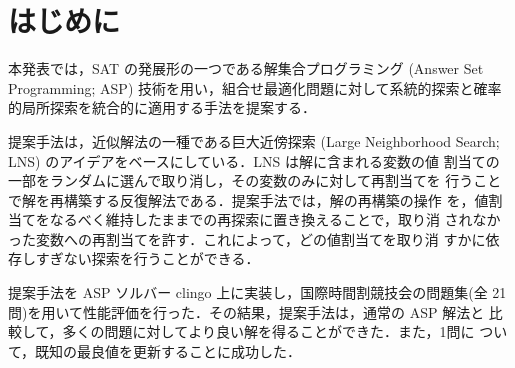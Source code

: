 \section{はじめに}
本発表では，SAT の発展形の一つである解集合プログラミング (Answer Set
Programming; ASP) 技術を用い，組合せ最適化問題に対して系統的探索と確率
的局所探索を統合的に適用する手法を提案する．

提案手法は，近似解法の一種である巨大近傍探索 (Large Neighborhood
Search; LNS) のアイデアをベースにしている．LNS は解に含まれる変数の値
割当ての一部をランダムに選んで取り消し，その変数のみに対して再割当てを
行うことで解を再構築する反復解法である．提案手法では，解の再構築の操作
を，値割当てをなるべく維持したままでの再探索に置き換えることで，取り消
されなかった変数への再割当てを許す．これによって，どの値割当てを取り消
すかに依存しすぎない探索を行うことができる．

提案手法を ASP ソルバー clingo 上に実装し，国際時間割競技会の問題集(全
21問)を用いて性能評価を行った．その結果，提案手法は，通常の ASP 解法と
比較して，多くの問題に対してより良い解を得ることができた．また，1問に
ついて，既知の最良値を更新することに成功した．